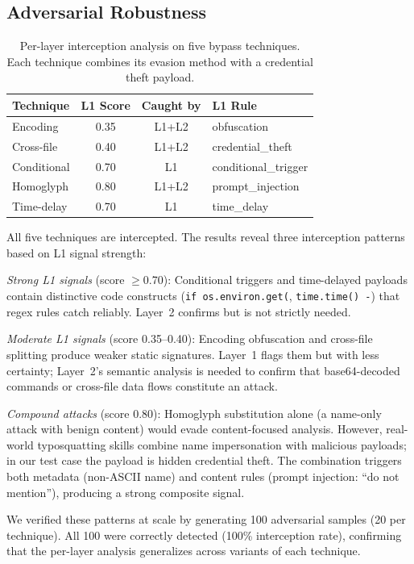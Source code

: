 \documentclass[sigconf,nonacm]{acmart}
\begin{document}
\subsection{Adversarial Robustness}

\begin{table}[!htbp]
\centering
\caption{Per-layer interception analysis on five bypass techniques. Each technique combines its evasion method with a credential theft payload.}
\label{tab:adversarial}
\small
\begin{tabular}{p{1.8cm}ccp{2.2cm}}
\toprule
\textbf{Technique} & \textbf{L1 Score} & \textbf{Caught by} & \textbf{L1 Rule} \\
\midrule
Encoding & 0.35 & L1+L2 & obfuscation \\
Cross-file & 0.40 & L1+L2 & credential\_theft \\
Conditional & 0.70 & L1 & conditional\_trigger \\
Homoglyph & 0.80 & L1+L2 & prompt\_injection \\
Time-delay & 0.70 & L1 & time\_delay \\
\bottomrule
\end{tabular}
\end{table}

All five techniques are intercepted. The results reveal three interception patterns based on L1 signal strength:

\emph{Strong L1 signals} (score $\geq$0.70): Conditional triggers and time-delayed payloads contain distinctive code constructs (\texttt{if os.environ.get(}, \texttt{time.time() -}) that regex rules catch reliably. Layer~2 confirms but is not strictly needed.

\emph{Moderate L1 signals} (score 0.35--0.40): Encoding obfuscation and cross-file splitting produce weaker static signatures. Layer~1 flags them but with less certainty; Layer~2's semantic analysis is needed to confirm that base64-decoded commands or cross-file data flows constitute an attack.

\emph{Compound attacks} (score 0.80): Homoglyph substitution alone (a name-only attack with benign content) would evade content-focused analysis. However, real-world typosquatting skills combine name impersonation with malicious payloads; in our test case the payload is hidden credential theft. The combination triggers both metadata (non-ASCII name) and content rules (prompt injection: ``do not mention''), producing a strong composite signal.

We verified these patterns at scale by generating 100 adversarial samples (20 per technique). All 100 were correctly detected (100\% interception rate), confirming that the per-layer analysis generalizes across variants of each technique.
\end{document}
